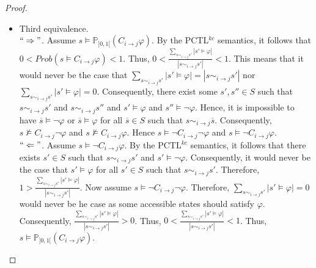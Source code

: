 \begin{proof}
\begin{itemize}
\item Third equivalence. ~\\
    $``\Rightarrow"$. Assume $s\models \mathbb{P}_{]0,1[} (C_{i \rightarrow j}\varphi)$. By the PCTL$^{kc}$ semantics,
    it follows that $0< Prob(s\models C_{i\rightarrow j}\varphi)<1$. Thus,
    $0<\frac{\sum_{s\sim_{i \rightarrow j}s'}|s'\models \varphi| }{|s \sim_{i \rightarrow j}s'|}<1$.
    This means that it would never be the case that $\sum_{s\sim_{i \rightarrow j}s'}|s'\models \varphi| = |s\sim_{i \rightarrow j}s'|$
    nor $\sum_{s\sim_{i \rightarrow j}s'}|s'\models \varphi| = 0$. Consequently, there exist some $s', s'' \in S$
    such that $s\sim_{i \rightarrow j}s'$ and $s\sim_{i \rightarrow j}s''$ and $s'\models \varphi$ and $s''\models \neg \varphi$.
    Hence, it is impossible to have
    $\overline{s}\models \neg\varphi$ or $\overline{s}\models \varphi$ for all $\overline{s}\in S$
    such that $s\sim_{i \rightarrow j}\overline{s}$. Consequently,
    $s\nvDash  C_{i \rightarrow j}\neg\varphi$ and $s\nvDash  C_{i \rightarrow
    j}\varphi$. Hence $s\models \neg C_{i \rightarrow j}\neg\varphi$ and $s\models \neg C_{i \rightarrow j}\varphi$. ~\\
    $``\Leftarrow"$. Assume $s\models \neg C_{i \rightarrow j}\varphi$. By the PCTL$^{kc}$ semantics,
    it follows that there exists $s'\in S$ such that $s\sim_{i \rightarrow j}s'$ and $s'\models \neg \varphi$.
    Consequently, it would never be the case that $s'\models \varphi$ for all $s'\in S$
    such that $s\sim_{i \rightarrow j}s'$. Therefore,
    $1>\frac{\sum_{s\sim_{i \rightarrow j}s'}|s'\models \varphi| }{|s\sim_{i \rightarrow j}s'|}$.
    Now assume $s\models \neg C_{i \rightarrow j}\neg \varphi$. Therefore, $\sum_{s\sim_{i \rightarrow j}s'}|s'\models \varphi| = 0$
    would never be he case as some accessible states should satisfy $\varphi$. Consequently,
    $\frac{\sum_{s\sim_{i \rightarrow j}s'}|s'\models \varphi| }{|s\sim_{i \rightarrow j}s'|}>0$.
    Thus, $0<\frac{\sum_{s\sim_{i \rightarrow j}s'}|s'\models \varphi| }{|s \sim_{i \rightarrow j}s'|}<1$.
    Thus, $s\models \mathbb{P}_{]0,1[} (C_{i \rightarrow
    j}\varphi)$.
\end{itemize}

\end{proof}


